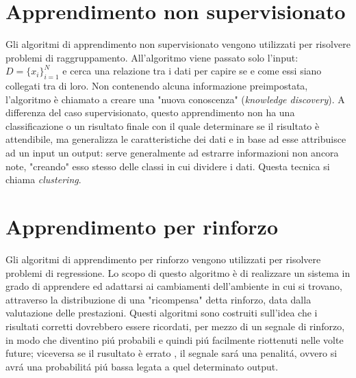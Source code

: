 \documentclass[a4paper,12pt,oneside]{book}
\begin{document}
\section{Apprendimento non supervisionato}
Gli algoritmi di apprendimento non supervisionato vengono utilizzati per risolvere problemi di raggruppamento.
All'algoritmo viene passato solo l'input: $D={\{ x_{i}\}}^{N}_{i=1}$ e cerca una relazione tra i dati per capire se e come essi siano collegati tra di loro. Non contenendo alcuna informazione preimpostata, l'algoritmo \`e chiamato a creare una "nuova conoscenza" (\textit{knowledge discovery}). A differenza del caso supervisionato, questo apprendimento non ha una classificazione o un risultato finale con il quale determinare se il risultato \`e attendibile, ma generalizza le caratteristiche dei dati e in base ad esse attribuisce ad un input un output: serve generalmente ad estrarre informazioni non ancora note, "creando" esso stesso delle classi in cui dividere i dati. Questa tecnica si chiama \textit{clustering}.

\section{Apprendimento per rinforzo}
Gli algoritmi di apprendimento per rinforzo vengono utilizzati per risolvere problemi di regressione.
Lo scopo di questo algoritmo \`e di realizzare un sistema in grado di apprendere ed adattarsi ai cambiamenti dell'ambiente in cui si trovano, attraverso la distribuzione di una "ricompensa" detta rinforzo, data dalla valutazione delle prestazioni. Questi algoritmi sono costruiti sull'idea che i risultati corretti dovrebbero essere ricordati, per mezzo di un segnale di rinforzo, in modo che diventino pi\'{u} probabili e quindi pi\'{u} facilmente riottenuti nelle volte future; viceversa se il rusultato \`e errato , il segnale sar\'{a} una penalit\'{a}, ovvero si avr\'{a} una probabilit\'{a} pi\'{u} bassa legata a quel determinato output.\cite{rinforzo}
\end{document}
